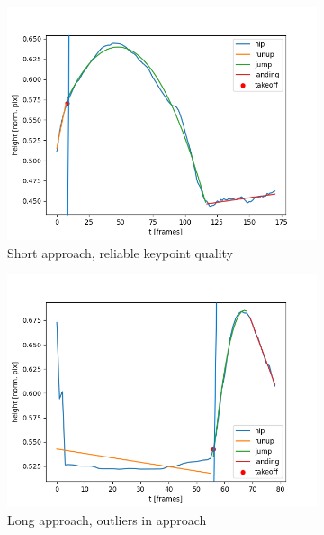 \begin{figure}[h!]
    \centering
    \begin{subfigure}{0.45\textwidth}
        \includegraphics[width=\textwidth]{regression_jump_only.png}
        \caption{Short approach, reliable keypoint quality}
    \end{subfigure}\hfill
    \begin{subfigure}{0.45\textwidth}
        \includegraphics[width=\textwidth]{regression_poor_approach.png}
        \caption{Long approach, outliers in approach}
    \end{subfigure}
    \begin{subfigure}{0.45\textwidth}

\end{subfigure}
\end{figure}
